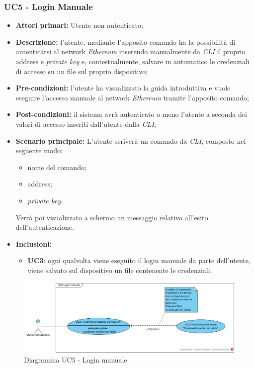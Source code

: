\subsubsection{UC5 - Login Manuale}
\begin{itemize}
	\item \textbf{Attori primari:} Utente non autenticato;
	\item \textbf{Descrizione:} l'utente, mediante l'apposito comando ha la possibilità di autenticarsi al network \textit{Ethereum\glo} inserendo manualmente da \textit{CLI\glo} il proprio address e \textit{private key\glos} e, contestualmente, salvare in automatico le credenziali di accesso su un file sul proprio dispositivo; 
	\item \textbf{Pre-condizioni:} l'utente ha visualizzato la guida introduttiva e vuole eseguire l'accesso manuale al network \textit{Ethereum} tramite l'apposito comando;
	\item \textbf{Post-condizioni:} il sistema avrà autenticato o meno l'utente a seconda dei valori di accesso inseriti dall'utente dalla \textit{CLI\glos};
	\item \textbf{Scenario principale:} L'utente scriverà un comando da \textit{CLI\glos}, composto nel seguente modo:
	\begin{itemize}
		\item nome del comando;
		\item address;
		\item \textit{private key\glos}.
	\end{itemize} 
	Verrà poi visualizzato a schermo un messaggio relativo all'esito dell'autenticazione.
	\item \textbf{Inclusioni:}
		\begin{itemize}
		\item\textbf{UC3}: ogni qualvolta viene eseguito il login manuale da parte dell'utente, viene salvato sul dispositivo un file contenente le credenziali.
	\end{itemize}  
\end{itemize}
\begin{figure}[h]
	\centering
	\includegraphics[width=\linewidth]{res/img/UC5.jpg}
	\caption{Diagramma UC5 - Login manuale}
\end{figure}